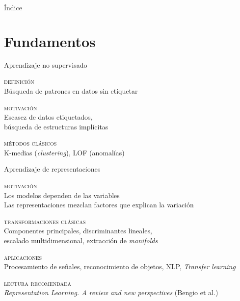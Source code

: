 \documentclass[13.5pt,aspectratio=169]{beamer}
\begin{document}
    
    
    \begin{frame}{Índice}
         \tableofcontents
     \end{frame}
     
     \section{Fundamentos}
     \begin{frame}{Aprendizaje no supervisado}
      \begin{fullpageitemize}
        \item \textsc{\color{colorblue}definición}\\Búsqueda de patrones en datos sin etiquetar
        \item \textsc{\color{colorblue}motivación}\\Escasez de datos etiquetados,\\búsqueda de estructuras implícitas
        \item \textsc{\color{colorblue}métodos clásicos}\\K-medias (\textit{clustering}), LOF (anomalías)
   \end{fullpageitemize}
\end{frame}
     
     \begin{frame}{Aprendizaje de representaciones}
      \begin{fullpageitemize}
     \item\textsc{\color{colorblue}motivación}\\Los modelos dependen de las variables\\Las representaciones mezclan factores que explican la variación
     \item\textsc{\color{colorblue}transformaciones clásicas}\\ Componentes principales, discriminantes lineales,\\escalado multidimensional, extracción de \textit{manifolds}
     \item\textsc{\color{colorblue}aplicaciones}\\Procesamiento de señales, reconocimiento de objetos, NLP, \textit{Transfer learning}
     \item\textsc{\color{colorblue}lectura recomendada}\\\textit{Representation Learning. A review and new perspectives} (Bengio {\scriptsize et al.})
   \end{fullpageitemize}
\end{frame}
     
\end{document}
